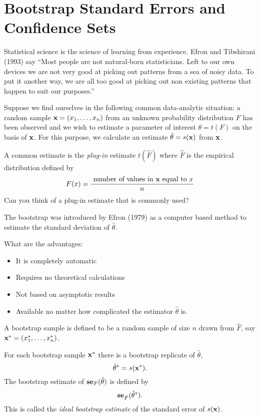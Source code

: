 \section{Bootstrap Standard Errors and Confidence Sets }
Statistical science is the science of learning from experience. 
Efron and Tibshirani (1993) say ``Most people are not natural-born
statisticians. Left to our own devices we are not very good at picking
out patterns from a sea of noisy data. To put it another way, we are
all too good at picking out non existing patterns that happen to suit
our purposes.''

Suppose we find ourselves in the following common data-analytic
situation: a random sample ${\mathbf x} = (x_1,\dots,x_n)$ from an unknown
probability distribution $F$ has been observed and we wish to estimate
a parameter of interest $\theta = t(F)$ on the basis of ${\mathbf x}$. For
this purpose, we calculate an estimate $\hat{\theta} = s({\mathbf x})$ from
${\mathbf x}$. 

A common estimate is the {\it plug-in} estimate $t(\hat{F})$
where $\hat{F}$ is the empirical distribution defined by
\[
F(x) = \frac{\mbox{ number of values in } {\mathbf x} \mbox{ equal
    to }x}{n} 
\]
Can you think of a plug-in estimate that is commonly used?


The bootstrap was introduced by Efron (1979) as a computer based
method to estimate the standard deviation of $\hat{\theta}$. 

What are the advantages:
\begin{itemize}
\item It is completely automatic
\item Requires no theoretical calculations
\item Not based on asymptotic results
\item Available no matter how complicated the estimator $\hat{\theta}$
  is.
\end{itemize}

A bootstrap sample is defined to be a random sample of size $n$ drawn
from $\hat{F}$, say ${\mathbf x}^* = (x_1^*,\dots,x_n^*)$.

For each bootstrap sample ${\mathbf x}^*$ there is a bootstrap replicate of
$\hat{\theta}$, 
\[
\hat{\theta}^* = s({\mathbf x}^*).
\]
The bootstrap estimate of ${\bf se}_F(\hat{\theta})$ is defined by 
\begin{equation}
\label{ibe}
{\bf se}_{\hat{F}}(\hat{\theta}^*).
\end{equation}
This is called the {\it ideal bootstrap estimate} of the standard
error of $s({\mathbf x})$.  

